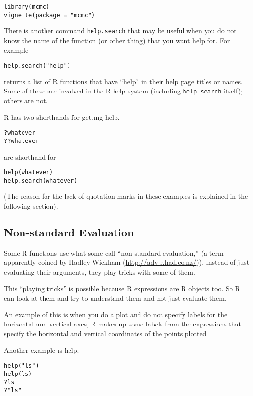 \documentclass[
]{article}
\begin{document}
\begin{verbatim}
library(mcmc)
vignette(package = "mcmc")
\end{verbatim}

There is another command \texttt{help.search} that may be useful when
you do not know the name of the function (or other thing) that you want
help for. For example

\begin{verbatim}
help.search("help")
\end{verbatim}

returns a list of R functions that have ``help'' in their help page
titles or names. Some of these are involved in the R help system
(including \texttt{help.search} itself); others are not.

R has two shorthands for getting help.

\begin{verbatim}
?whatever
??whatever
\end{verbatim}

are shorthand for

\begin{verbatim}
help(whatever)
help.search(whatever)
\end{verbatim}

(The reason for the lack of quotation marks in these examples is
explained in the following section).

\hypertarget{non-standard-evaluation}{%
\subsection{Non-standard Evaluation}\label{non-standard-evaluation}}

Some R functions use what some call ``non-standard evaluation,'' (a term
apparently coined by Hadley Wickham (\url{http://adv-r.had.co.nz/})).
Instead of just evaluating their arguments, they play tricks with some
of them.

This ``playing tricks'' is possible because R expressions are R objects
too. So R can look at them and try to understand them and not just
evaluate them.

An example of this is when you do a plot and do not specify labels for
the horizontal and vertical axes, R makes up some labels from the
expressions that specify the horizontal and vertical coordinates of the
points plotted.

Another example is help.

\begin{verbatim}
help("ls")
help(ls)
?ls
?"ls"
\end{verbatim}
\end{document}
